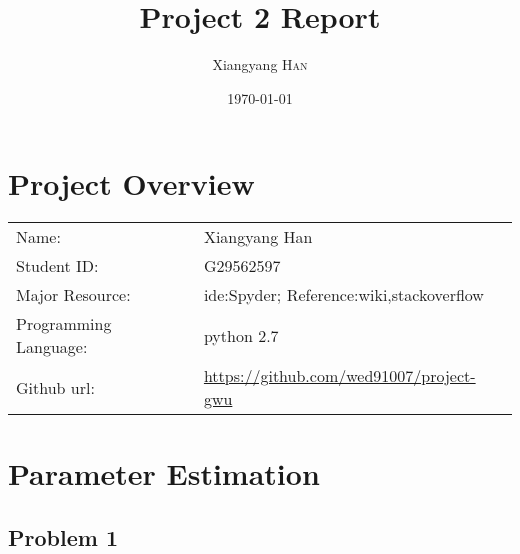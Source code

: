 \documentclass{article}
\title{Project 2 Report} %
\author{Xiangyang \textsc{Han}} %
\date{\today} %
\begin{document}
\maketitle %



\section{Project Overview}


\begin{tabular}{ll}
Name:&Xiangyang Han\\
Student ID:&G29562597\\
Major Resource:&ide:Spyder; Reference:wiki,stackoverflow\\
Programming Language:&python 2.7\\
Github url:&\url{https://github.com/wed91007/project-gwu}
\end{tabular}




 

\section{Parameter Estimation}

\subsection{Problem 1}
\end{document}
